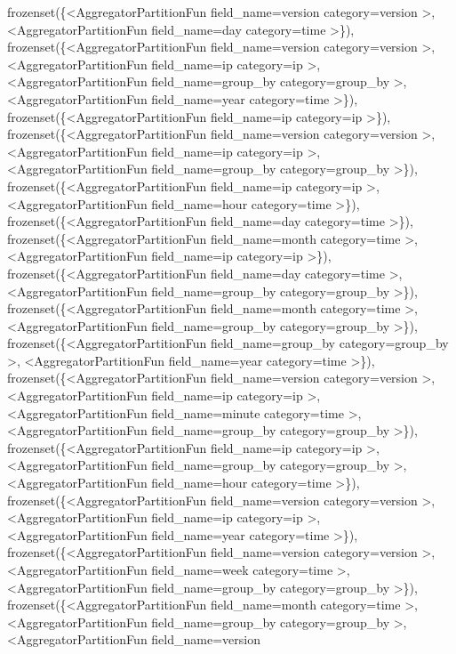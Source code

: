 \documentclass[letterpaper,10pt,english]{sphinxmanual}
\begin{document}
\begin{fulllineitems}
\begin{fulllineitems}
frozenset(\{\textless{}AggregatorPartitionFun field\_name=version category=version \textgreater{}, \textless{}AggregatorPartitionFun field\_name=day category=time \textgreater{}\}), frozenset(\{\textless{}AggregatorPartitionFun field\_name=version category=version \textgreater{}, \textless{}AggregatorPartitionFun field\_name=ip category=ip \textgreater{}, \textless{}AggregatorPartitionFun field\_name=group\_by category=group\_by \textgreater{}, \textless{}AggregatorPartitionFun field\_name=year category=time \textgreater{}\}), frozenset(\{\textless{}AggregatorPartitionFun field\_name=ip category=ip \textgreater{}\}), frozenset(\{\textless{}AggregatorPartitionFun field\_name=version category=version \textgreater{}, \textless{}AggregatorPartitionFun field\_name=ip category=ip \textgreater{}, \textless{}AggregatorPartitionFun field\_name=group\_by category=group\_by \textgreater{}\}), frozenset(\{\textless{}AggregatorPartitionFun field\_name=ip category=ip \textgreater{}, \textless{}AggregatorPartitionFun field\_name=hour category=time \textgreater{}\}), frozenset(\{\textless{}AggregatorPartitionFun field\_name=day category=time \textgreater{}\}), frozenset(\{\textless{}AggregatorPartitionFun field\_name=month category=time \textgreater{}, \textless{}AggregatorPartitionFun field\_name=ip category=ip \textgreater{}\}), frozenset(\{\textless{}AggregatorPartitionFun field\_name=day category=time \textgreater{}, \textless{}AggregatorPartitionFun field\_name=group\_by category=group\_by \textgreater{}\}), frozenset(\{\textless{}AggregatorPartitionFun field\_name=month category=time \textgreater{}, \textless{}AggregatorPartitionFun field\_name=group\_by category=group\_by \textgreater{}\}), frozenset(\{\textless{}AggregatorPartitionFun field\_name=group\_by category=group\_by \textgreater{}, \textless{}AggregatorPartitionFun field\_name=year category=time \textgreater{}\}), frozenset(\{\textless{}AggregatorPartitionFun field\_name=version category=version \textgreater{}, \textless{}AggregatorPartitionFun field\_name=ip category=ip \textgreater{}, \textless{}AggregatorPartitionFun field\_name=minute category=time \textgreater{}, \textless{}AggregatorPartitionFun field\_name=group\_by category=group\_by \textgreater{}\}), frozenset(\{\textless{}AggregatorPartitionFun field\_name=ip category=ip \textgreater{}, \textless{}AggregatorPartitionFun field\_name=group\_by category=group\_by \textgreater{}, \textless{}AggregatorPartitionFun field\_name=hour category=time \textgreater{}\}), frozenset(\{\textless{}AggregatorPartitionFun field\_name=version category=version \textgreater{}, \textless{}AggregatorPartitionFun field\_name=ip category=ip \textgreater{}, \textless{}AggregatorPartitionFun field\_name=year category=time \textgreater{}\}), frozenset(\{\textless{}AggregatorPartitionFun field\_name=version category=version \textgreater{}, \textless{}AggregatorPartitionFun field\_name=week category=time \textgreater{}, \textless{}AggregatorPartitionFun field\_name=group\_by category=group\_by \textgreater{}\}), frozenset(\{\textless{}AggregatorPartitionFun field\_name=month category=time \textgreater{}, \textless{}AggregatorPartitionFun field\_name=group\_by category=group\_by \textgreater{}, \textless{}AggregatorPartitionFun field\_name=version 
\end{fulllineitems}
\end{fulllineitems}
\end{document}
